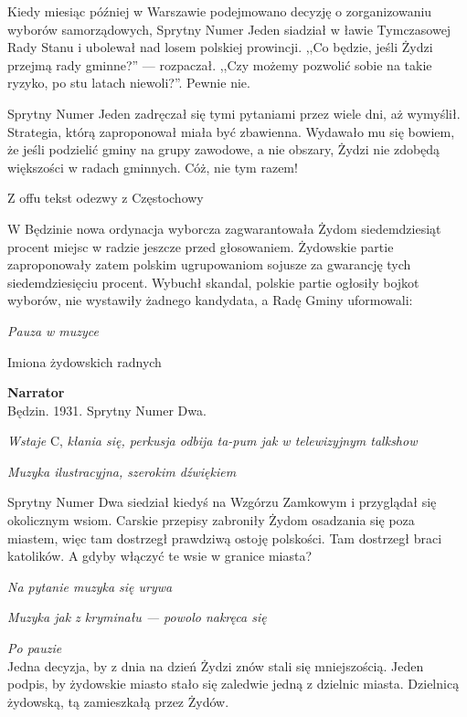 \documentclass[11pt,a4paper,oneside]{article}
\begin{document}
Kiedy miesiąc później w Warszawie podejmowano decyzję o zorganizowaniu wyborów
samorządowych, Sprytny Numer Jeden siadział w ławie Tymczasowej Rady Stanu
i ubolewał nad losem polskiej prowincji. ,,Co będzie, jeśli Żydzi przejmą
rady gminne?'' --- rozpaczał. ,,Czy możemy pozwolić sobie na takie ryzyko,
po stu latach niewoli?''. Pewnie nie.

Sprytny Numer Jeden zadręczał się tymi pytaniami przez wiele dni, aż
wymyślił. Strategia, którą zaproponował miała być zbawienna. Wydawało 
mu się bowiem, że jeśli podzielić gminy na grupy zawodowe, a nie obszary,
Żydzi nie zdobędą większości w radach gminnych. Cóż, nie tym razem!

{\color{red}Z offu tekst odezwy z Częstochowy}

W Będzinie nowa ordynacja wyborcza zagwarantowała Żydom siedemdziesiąt
procent miejsc w radzie jeszcze przed głosowaniem. Żydowskie partie
zaproponowały zatem polskim ugrupowaniom sojusze za gwarancję tych
siedemdziesięciu procent. Wybuchł skandal, polskie partie ogłosiły
bojkot wyborów, nie wystawiły żadnego kandydata, a Radę Gminy uformowali:

{\color{light-gray} \emph{Pauza w muzyce}}


{\color{red}Imiona żydowskich radnych}


\textbf{Narrator}\\
Będzin. 1931. Sprytny Numer Dwa. 

{\color{light-gray} \emph{Wstaje} C, \emph{kłania się, perkusja odbija
ta-pum jak w telewizyjnym talkshow}}

{\color{light-gray} \emph{Muzyka ilustracyjna, szerokim dźwiękiem}}

Sprytny Numer Dwa siedział kiedyś na Wzgórzu Zamkowym i przyglądał się
okolicznym wsiom. Carskie przepisy zabroniły Żydom osadzania się poza
miastem, więc tam dostrzegł prawdziwą ostoję polskości. Tam dostrzegł
braci katolików. A gdyby włączyć te wsie w granice miasta?  

{\color{light-gray} \emph{Na pytanie muzyka się urywa}}

{\color{light-gray} \emph{Muzyka jak z kryminału --- powolo nakręca się}}

{\color{light-gray} \emph{Po pauzie}}\\
Jedna decyzja, by z dnia na dzień Żydzi znów stali się mniejszością.
Jeden podpis, by żydowskie miasto stało się zaledwie jedną z dzielnic
miasta.  Dzielnicą żydowską, tą zamieszkałą przez Żydów. 
\end{document}
